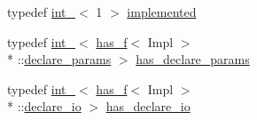 \begin{DoxyCompactItemize}
\item 
typedef \hyperlink{structecto_1_1cell___1_1int__}{int\-\_\-}$<$ 1 $>$ \hyperlink{structecto_1_1cell___a63c5c3dd95630a508017730ee345c23a}{implemented}
\item 
typedef \hyperlink{structecto_1_1cell___1_1int__}{int\-\_\-}$<$ \hyperlink{structecto_1_1has__f}{has\-\_\-f}$<$ Impl $>$\\*
\-::\hyperlink{structecto_1_1cell___a6a36edc8e9eddadfe6486460bab93c93}{declare\-\_\-params} $>$ \hyperlink{structecto_1_1cell___ab7b111eb2672ae4eaacc668852b8b89f}{has\-\_\-declare\-\_\-params}
\item 
typedef \hyperlink{structecto_1_1cell___1_1int__}{int\-\_\-}$<$ \hyperlink{structecto_1_1has__f}{has\-\_\-f}$<$ Impl $>$\\*
\-::\hyperlink{structecto_1_1cell___ac08370823fea8ed7f5991e369f6a7fa7}{declare\-\_\-io} $>$ \hyperlink{structecto_1_1cell___a10ab0d3f85e194d548beb3251416a569}{has\-\_\-declare\-\_\-io}
\end{DoxyCompactItemize}
